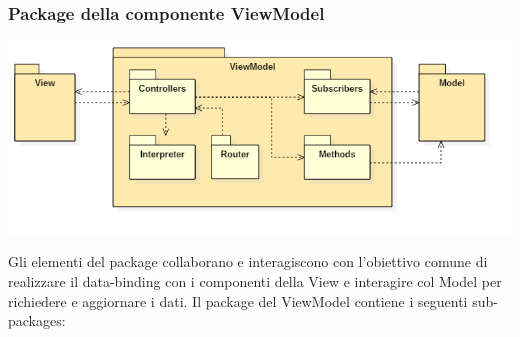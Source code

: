 \subsubsection{Package della componente ViewModel}
	\begin{center}
		\includegraphics[scale=0.65]{../images/ViewModelPackage.png}
	\end{center}
	Gli elementi del package collaborano e interagiscono con l'obiettivo comune di realizzare il data-binding con i componenti della View e interagire col Model per richiedere e aggiornare i dati.
	Il package del ViewModel contiene i seguenti sub-packages:
